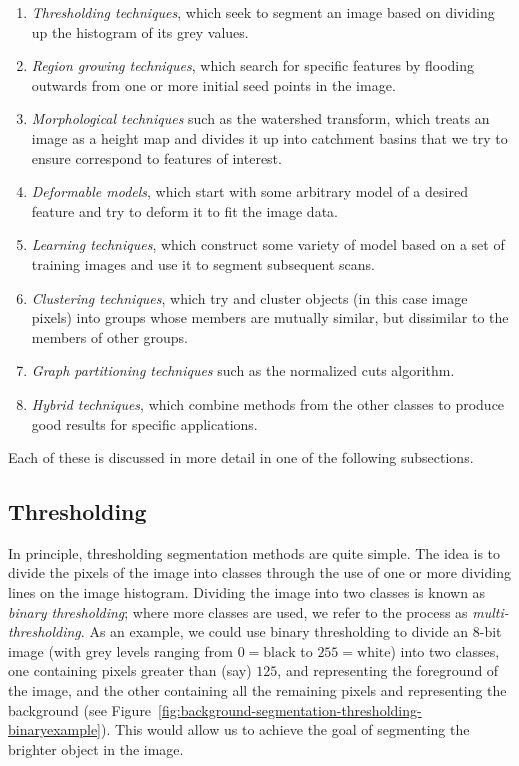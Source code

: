 \begin{enumerate}

\item \emph{Thresholding techniques}, which seek to segment an image based on dividing up the histogram of its grey values.
\item \emph{Region growing techniques}, which search for specific features by flooding outwards from one or more initial seed points in the image.
\item \emph{Morphological techniques} such as the watershed transform, which treats an image as a height map and divides it up into catchment basins that we try to ensure correspond to features of interest.
\item \emph{Deformable models}, which start with some arbitrary model of a desired feature and try to deform it to fit the image data.
\item \emph{Learning techniques}, which construct some variety of model based on a set of training images and use it to segment subsequent scans.
\item \emph{Clustering techniques}, which try and cluster objects (in this case image pixels) into groups whose members are mutually similar, but dissimilar to the members of other groups.
\item \emph{Graph partitioning techniques} such as the normalized cuts algorithm.
\item \emph{Hybrid techniques}, which combine methods from the other classes to produce good results for specific applications.

\end{enumerate}

\noindent Each of these is discussed in more detail in one of the following subsections.

\subsection{Thresholding}

In principle, thresholding segmentation methods are quite simple. The idea is to divide the pixels of the image into classes through the use of one or more dividing lines on the image histogram. Dividing the image into two classes is known as \emph{binary thresholding}; where more classes are used, we refer to the process as \emph{multi-thresholding}. As an example, we could use binary thresholding to divide an 8-bit image (with grey levels ranging from $0 = \mbox{black}$ to $255 = \mbox{white}$) into two classes, one containing pixels greater than (say) $125$, and representing the foreground of the image, and the other containing all the remaining pixels and representing the background (see Figure~\ref{fig:background-segmentation-thresholding-binaryexample}). This would allow us to achieve the goal of segmenting the brighter object in the image.

